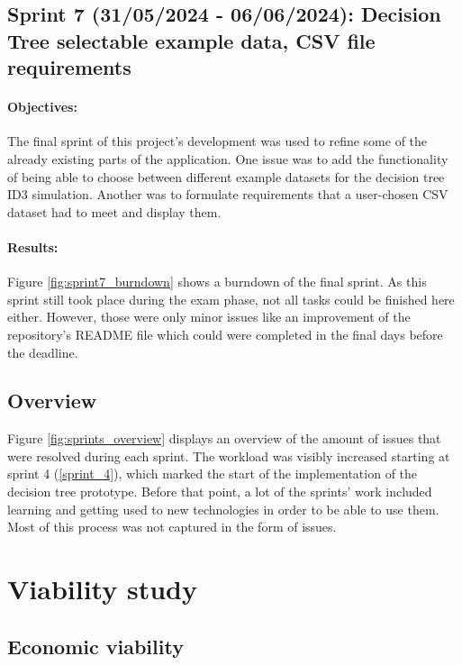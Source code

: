 \subsection{Sprint 7 (31/05/2024 - 06/06/2024): Decision Tree selectable example data, CSV file requirements}
\paragraph{Objectives:}
The final sprint of this project's development was used to refine some of the already existing parts of the application. One issue was to add the functionality of being able to choose between different example datasets for the decision tree ID3 simulation. Another was to formulate requirements that a user-chosen CSV dataset had to meet and display them.

\paragraph{Results:}
Figure \ref{fig:sprint7_burndown} shows a burndown of the final sprint. As this sprint still took place during the exam phase, not all tasks could be finished here either.  However, those were only minor issues like an improvement of the repository's README file which could were completed in the final days before the deadline.

\subsection{Overview}
Figure \ref{fig:sprints_overview} displays an overview of the amount of issues that were resolved during each sprint.
The workload was visibly increased starting at sprint 4 (\ref{sprint_4}), which marked the start of the implementation of the decision tree prototype. Before that point, a lot of the sprints' work included learning and getting used to new technologies in order to be able to use them. Most of this process was not captured in the form of issues. 

\section{Viability study}

\subsection{Economic viability}
